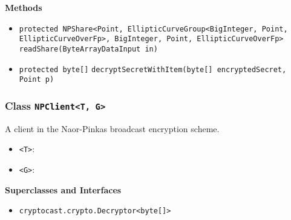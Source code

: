\textbf{\sffamily Methods}
\begin{itemize}
\item \lstinline|protected NPShare<Point, EllipticCurveGroup<BigInteger, Point, EllipticCurveOverFp>, BigInteger, Point, EllipticCurveOverFp>| \lstinline|readShare|\lstinline|(ByteArrayDataInput in)| \\[-0.6em]




\item \lstinline|protected byte[]| \lstinline|decryptSecretWithItem|\lstinline|(byte[] encryptedSecret, Point p)| \\[-0.6em]




\end{itemize}

\subsubsection{Class \lstinline|NPClient<T, G>|}
A client in the Naor-Pinkas broadcast encryption scheme. \\
\noindent\begin{minipage}[t]{5cm}
\vspace{0.3em}
\hspace*{2em}
\vspace{0.3em}
\end{minipage}

\begin{itemize}
\item \lstinline|<T>|: 
\item \lstinline|<G>|: 
\end{itemize}


\textbf{\sffamily Superclasses and Interfaces}
\begin{itemize}
\item \lstinline|cryptocast.crypto.Decryptor<byte[]>|
\end{itemize}


